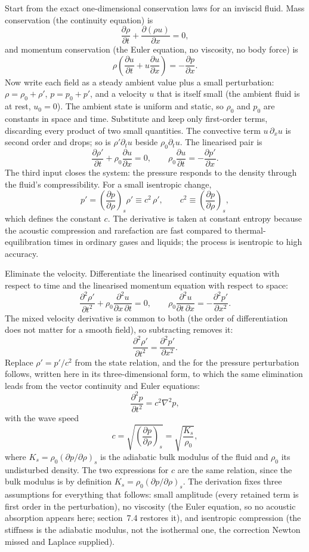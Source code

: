 Start from the exact one-dimensional conservation laws for an inviscid
fluid. Mass conservation (the continuity equation) is
\[
\frac{\partial \rho}{\partial t}
+ \frac{\partial (\rho u)}{\partial x} = 0,
\]
and momentum conservation (the Euler equation, no viscosity, no body
force) is
\[
\rho\left(\frac{\partial u}{\partial t}
+ u\frac{\partial u}{\partial x}\right)
= -\frac{\partial p}{\partial x}.
\]
Now write each field as a steady ambient value plus a small
perturbation: $\rho = \rho_0 + \rho'$, $p = p_0 + p'$, and a velocity
$u$ that is itself small (the ambient fluid is at rest, $u_0 = 0$). The
ambient state is uniform and static, so $\rho_0$ and $p_0$ are constants
in space and time. Substitute and keep only first-order terms,
discarding every product of two small quantities. The convective term
$u\,\partial_x u$ is second order and drops; so is $\rho' \partial_t u$
beside $\rho_0 \partial_t u$. The linearised pair is
\[
\frac{\partial \rho'}{\partial t}
+ \rho_0\frac{\partial u}{\partial x} = 0,
\qquad
\rho_0\frac{\partial u}{\partial t}
= -\frac{\partial p'}{\partial x}.
\]
The third input closes the system: the pressure responds to the density
through the fluid's compressibility. For a small isentropic change,
\[
p' = \left(\frac{\partial p}{\partial \rho}\right)_s \rho'
   \equiv c^2\,\rho',
\qquad
c^2 \equiv \left(\frac{\partial p}{\partial \rho}\right)_s,
\]
which defines the constant $c$. The derivative is taken at constant
entropy because the acoustic compression and rarefaction are fast
compared to thermal-equilibration times in ordinary gases and liquids;
the process is isentropic to high accuracy.

Eliminate the velocity. Differentiate the linearised continuity
equation with respect to time and the linearised momentum equation with
respect to space:
\[
\frac{\partial^2 \rho'}{\partial t^2}
+ \rho_0\frac{\partial^2 u}{\partial x\,\partial t} = 0,
\qquad
\rho_0\frac{\partial^2 u}{\partial t\,\partial x}
= -\frac{\partial^2 p'}{\partial x^2}.
\]
The mixed velocity derivative is common to both (the order of
differentiation does not matter for a smooth field), so subtracting
removes it:
\[
\frac{\partial^2 \rho'}{\partial t^2}
= \frac{\partial^2 p'}{\partial x^2}.
\]
Replace $\rho' = p'/c^2$ from the state relation, and the
 for the pressure perturbation follows,
written here in its three-dimensional form, to which the same
elimination leads from the vector continuity and Euler equations:
\[
\frac{\partial^2 p}{\partial t^2} = c^2 \nabla^2 p,
\]
with the wave speed
\[
c = \sqrt{\left(\frac{\partial p}{\partial \rho}\right)_s} =
\sqrt{\frac{K_s}{\rho_0}},
\]
where $K_s = \rho_0 (\partial p/\partial\rho)_s$ is the adiabatic bulk
modulus of the fluid and $\rho_0$ its undisturbed density. The two
expressions for $c$ are the same relation, since the bulk modulus is by
definition $K_s = \rho_0 (\partial p/\partial\rho)_s$. The derivation
fixes three assumptions for everything that follows: small amplitude
(every retained term is first order in the perturbation), no viscosity
(the Euler equation, so no acoustic absorption appears here; section~7.4
restores it), and isentropic compression (the stiffness is the adiabatic
modulus, not the isothermal one, the correction Newton missed and Laplace
supplied).

